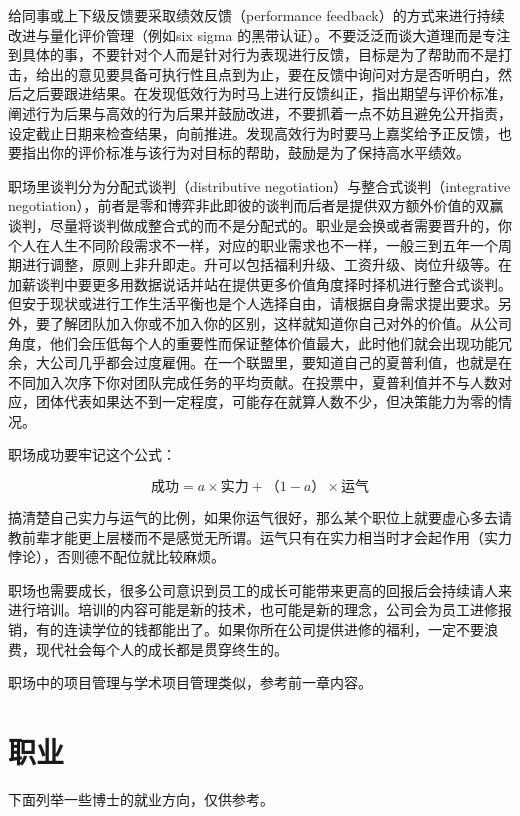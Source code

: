 \documentclass[]{tufte-book}
\begin{document}
给同事或上下级反馈要采取绩效反馈（performance feedback）的方式来进行持续改进与量化评价管理（例如six sigma 的黑带认证）。不要泛泛而谈大道理而是专注到具体的事，不要针对个人而是针对行为表现进行反馈，目标是为了帮助而不是打击，给出的意见要具备可执行性且点到为止，要在反馈中询问对方是否听明白，然后之后要跟进结果。在发现低效行为时马上进行反馈纠正，指出期望与评价标准，阐述行为后果与高效的行为后果并鼓励改进，不要抓着一点不妨且避免公开指责，设定截止日期来检查结果，向前推进。发现高效行为时要马上嘉奖给予正反馈，也要指出你的评价标准与该行为对目标的帮助，鼓励是为了保持高水平绩效。

职场里谈判分为分配式谈判（distributive negotiation）与整合式谈判（integrative negotiation），前者是零和博弈非此即彼的谈判而后者是提供双方额外价值的双赢谈判，尽量将谈判做成整合式的而不是分配式的。职业是会换或者需要晋升的，你个人在人生不同阶段需求不一样，对应的职业需求也不一样，一般三到五年一个周期进行调整，原则上非升即走。升可以包括福利升级、工资升级、岗位升级等。在加薪谈判中要更多用数据说话并站在提供更多价值角度择时择机进行整合式谈判。但安于现状或进行工作生活平衡也是个人选择自由，请根据自身需求提出要求。另外，要了解团队加入你或不加入你的区别，这样就知道你自己对外的价值。从公司角度，他们会压低每个人的重要性而保证整体价值最大，此时他们就会出现功能冗余，大公司几乎都会过度雇佣。在一个联盟里，要知道自己的夏普利值，也就是在不同加入次序下你对团队完成任务的平均贡献。在投票中，夏普利值并不与人数对应，团体代表如果达不到一定程度，可能存在就算人数不少，但决策能力为零的情况。

职场成功要牢记这个公式：

\[成功=a×实力+（1-a）×运气\]

搞清楚自己实力与运气的比例，如果你运气很好，那么某个职位上就要虚心多去请教前辈才能更上层楼而不是感觉无所谓。运气只有在实力相当时才会起作用（实力悖论），否则德不配位就比较麻烦。

职场也需要成长，很多公司意识到员工的成长可能带来更高的回报后会持续请人来进行培训。培训的内容可能是新的技术，也可能是新的理念，公司会为员工进修报销，有的连读学位的钱都能出了。如果你所在公司提供进修的福利，一定不要浪费，现代社会每个人的成长都是贯穿终生的。

职场中的项目管理与学术项目管理类似，参考前一章内容。

\hypertarget{ux804cux4e1a}{%
\section{职业}\label{ux804cux4e1a}}

下面列举一些博士的就业方向，仅供参考。
\end{document}
